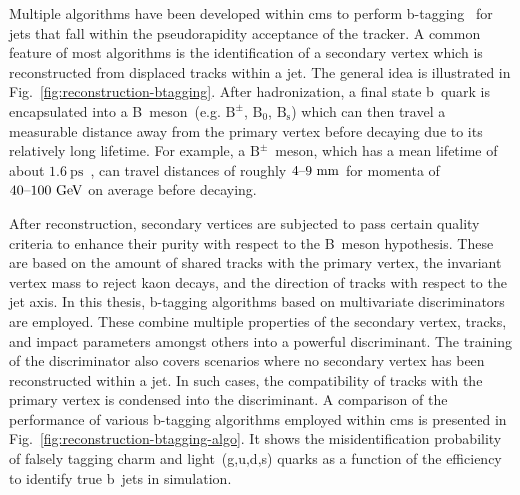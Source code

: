 Multiple algorithms have been developed within \gls{cms} to perform b-tagging~\cite{Chatrchyan:2012jua,CMS-PAS-BTV-15-001} for jets that fall within the pseudorapidity acceptance of the tracker. A common feature of most algorithms is the identification of a secondary vertex which is reconstructed from displaced tracks within a jet. The general idea is illustrated in Fig.~\ref{fig:reconstruction-btagging}. After hadronization, a final state b~quark is encapsulated into a B~meson~(e.g. $\mathrm{B}^{\pm}$, $\mathrm{B}_{0}$, $\mathrm{B}_\mathrm{s}$) which can then travel a measurable distance away from the primary vertex before decaying due to its relatively long lifetime. For example, a $\mathrm{B}^{\pm}$~meson, which has a mean lifetime of about $1.6~\mathrm{ps}$~\cite{Olive:2016xmw}, can travel distances of roughly $4\text{--}9~\mathrm{mm}$ for momenta of $40\text{--}100~\textrm{GeV}$ on average before decaying.


After reconstruction, secondary vertices are subjected to pass certain quality criteria to enhance their purity with respect to the B~meson hypothesis. These are based on the amount of shared tracks with the primary vertex, the invariant vertex mass to reject kaon decays, and the direction of tracks with respect to the jet axis. In this thesis, b-tagging algorithms based on multivariate discriminators are employed. These combine multiple properties of the secondary vertex, tracks, and impact parameters amongst others into a powerful discriminant. The training of the discriminator also covers scenarios where no secondary vertex has been reconstructed within a jet. In such cases, the compatibility of tracks with the primary vertex is condensed into the discriminant. A comparison of the performance of various b-tagging algorithms employed within \gls{cms} is presented in Fig.~\ref{fig:reconstruction-btagging-algo}. It shows the misidentification probability of falsely tagging charm and light~(g,u,d,s) quarks as a function of the efficiency to identify true b~jets in simulation.

